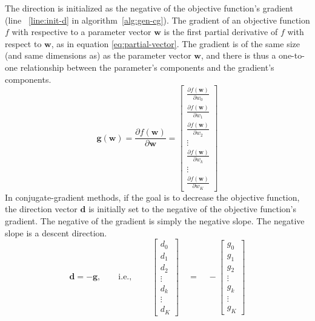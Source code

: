 The direction is initialized as the negative of the objective function's gradient
(line ~\ref{line:init-d} in algorithm~\ref{alg:gen-cg}). The gradient of an objective
function $f$ with respective to a parameter vector $\textbf{w}$ is the first partial derivative of $f$ with respect to
$\textbf{w}$, as in equation \eqref{eq:partial-vector}.  The gradient is of the same size (and same dimensions as) as the parameter vector $\textbf{w}$, and there is thus a one-to-one relationship between the parameter's components and the gradient's components.
\begin{equation}
\label{eq:partial-vector}
\textbf{g}(\mathbf{w}) = \frac{\partial f(\mathbf{w})}{\partial \mathbf{w}} =
  \begin{bmatrix}
    \frac{\partial f(\mathbf{w})}{\partial w_0}\\
    \frac{\partial f(\mathbf{w})}{\partial w_1} \\
    \frac{\partial f(\mathbf{w})}{\partial w_2}\\
    \vdots \\
	\frac{\partial f(\mathbf{w})}{\partial w_k}\\
	\vdots \\
	\frac{\partial f(\mathbf{w})}{\partial w_K}
  \end{bmatrix}
\end{equation}
In conjugate-gradient methods, if the goal is to decrease the objective function, the direction vector $\textbf{d}$  is initially set to the negative of the objective function's gradient. The negative of the gradient is simply the negative slope.  The negative slope is a descent direction. 
\begin{equation}
\textbf{d} = - \textbf{g}, \qquad \text{i.e., } \qquad
 \begin{bmatrix}
      d_0\\
    d_1 \\
   d_2\\
    \vdots \\
	d_k\\
	\vdots \\
	d_K
  \end{bmatrix} \quad =
\quad 
-\begin{bmatrix}
    g_0\\
    g_1 \\
   g_2\\
    \vdots \\
	g_k\\
	\vdots \\
	g_K
	\end{bmatrix}
  \end{equation}

